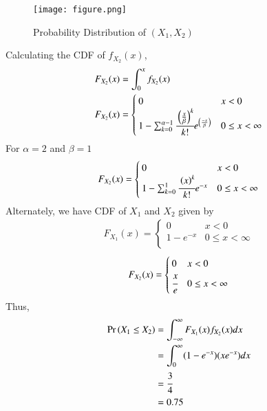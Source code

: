 \documentclass[journal,12pt,twocolumn]{IEEEtran}
\begin{document}
\begin{figure}[!ht]
\centering
\texttt{[image: figure.png]}
\caption{Probability Distribution of $(X_1, X_2)$}
\end{figure}

Calculating the CDF of $f_{X_2}(x)$,\\
\begin{align}
    F_{X_2}(x)&= \int_0^x f_{X_2}(x)\\
    F_{X_2}(x)&=
    \begin{cases}
    0 & x<0\\
    1- \sum_{k=0}^{\alpha-1} \cfrac{\left(\frac{x}{\beta}\right)^k}{k!}e^{\left(\frac{-x}{\beta}\right)} & 0 \le x <\infty
    \end{cases}
\end{align}
For $\alpha=2$ and $\beta=1$\\
\begin{align}
    F_{X_2}(x) = 
    \begin{cases}
    0   & x < 0\\
     1- \sum_{k=0}^{1} \cfrac{\left(x\right)^k}{k!}e^{-x} & 0\le x < \infty\\
    \end{cases}
\end{align}
Alternately, we have CDF of $X_1$ and $X_2$ given by 
\begin{align}
    F_{X_1}(x) = 
    \begin{cases}
     0   & x < 0\\
    1-e^{-x} & 0\le x < \infty\\
    \end{cases}
\end{align}
\begin{align}
    F_{X_2}(x) = 
    \begin{cases}
    0   & x < 0\\
    \cfrac{x}{e} & 0\le x < \infty\\
    \end{cases}
\end{align}
Thus, 
\begin{align}
    \Pr\left(X_1\le X_2\right) &= \int_{-\infty}^{\infty} F_{X_1}(x)f_{X_2}(x)dx\\
                &= \int_0^\infty(1-e^{-x})(xe^{-x})dx\\
                &= \cfrac{3}{4}\\
                &= 0.75
\end{align}
\end{document}
